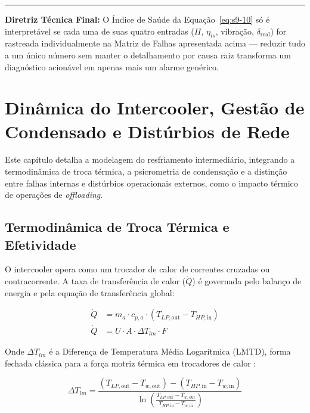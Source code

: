\documentclass[12pt,a4paper]{article}
\numberwithin{equation}{section}
\numberwithin{table}{section}
\numberwithin{figure}{section}
\begin{document}
	\vspace{1em}
	\hrule
	\vspace{1em}

	\textbf{Diretriz Técnica Final:} O Índice de Saúde da Equação~\eqref{eq:s9-10} só é interpretável se cada uma de suas quatro entradas ($\Pi$, $\eta_{is}$, vibração, $\delta_{\text{real}}$) for rastreada individualmente na Matriz de Falhas apresentada acima — reduzir tudo a um único número sem manter o detalhamento por causa raiz transforma um diagnóstico acionável em apenas mais um alarme genérico.

	
	
	\section{\textbf{Dinâmica do Intercooler, Gestão de Condensado e Distúrbios de Rede}}
	
	Este capítulo detalha a modelagem do resfriamento intermediário, integrando a termodinâmica de troca térmica, a psicrometria de condensação e a distinção entre falhas internas e distúrbios operacionais externos, como o impacto térmico de operações de \textit{offloading}.
	
	\subsection{\textbf{Termodinâmica de Troca Térmica e Efetividade}}
	O intercooler opera como um trocador de calor de correntes cruzadas ou contracorrente. A taxa de transferência de calor ($\dot{Q}$) é governada pelo balanço de energia e pela equação de transferência global:
	
	\begin{equation}\label{eq:s10-1}
	\begin{aligned}
		\dot{Q} &= \dot{m}_a \cdot c_{p,a} \cdot (T_{LP,\text{out}} - T_{HP,\text{in}}) \\[4pt]
		\dot{Q} &= U \cdot A \cdot \Delta T_{lm} \cdot F
	\end{aligned}
\end{equation}
	
	Onde $\Delta T_{lm}$ é a Diferença de Temperatura Média Logarítmica (LMTD), forma fechada clássica para a força motriz térmica em trocadores de calor \cite{cengel}:
	
	\begin{equation}\label{eq:s10-2}
	\Delta T_{lm} = \frac{(T_{LP,\text{out}} - T_{w,\text{out}}) - (T_{HP,\text{in}} - T_{w,\text{in}})}{\ln \left( \frac{T_{LP,\text{out}} - T_{w,\text{out}}}{T_{HP,\text{in}} - T_{w,\text{in}}} \right)}
\end{equation}
\end{document}
